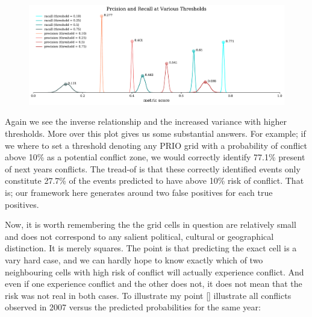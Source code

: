 \documentclass[a4paper]{article}
\begin{document}
\begin{figure}[!htb]
	\centering
	\includegraphics[scale=0.5]{threshold_plot.pdf}
    \caption{\footnotesize{}}\label{threshold_plot}
\end{figure}

Again we see the inverse relationship and the increased variance with higher thresholds. More over this plot gives us some substantial answers. For example; if we where to set a threshold denoting any PRIO grid with a probability of conflict above 10\% as a potential conflict zone, we would correctly identify 77.1\% present of next years conflicts. The tread-of is that these correctly identified events only constitute 27.7\% of the events predicted to have above 10\% risk of conflict. That is; our framework here generates around two false positives for each true positives.\par

Now, it is worth remembering the the grid cells in question are relatively small and does not correspond to any salient political, cultural or geographical distinction. It is merely squares. The point is that predicting the exact cell is a vary hard case, and we can hardly hope to know exactly which of two neighbouring cells with high risk of conflict will actually experience conflict. And even if one experience conflict and the other does not, it does not mean that the risk was not real in both cases. To illustrate my point \autoref{} illustrate all conflicts observed in 2007 versus the predicted probabilities for the same year:\par
\end{document}
